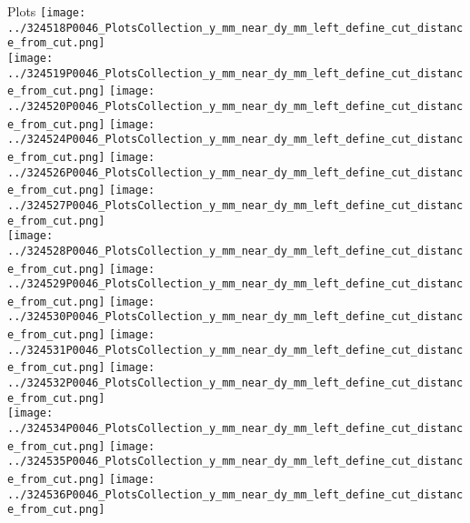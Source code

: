 \documentclass{beamer}
\begin{document}
\begin{frame}
\begin{block}{Plots}
                \texttt{[image: ../324518P0046\_PlotsCollection\_y\_mm\_near\_dy\_mm\_left\_define\_cut\_distance\_from\_cut.png]}\\
                \texttt{[image: ../324519P0046\_PlotsCollection\_y\_mm\_near\_dy\_mm\_left\_define\_cut\_distance\_from\_cut.png]}
                \texttt{[image: ../324520P0046\_PlotsCollection\_y\_mm\_near\_dy\_mm\_left\_define\_cut\_distance\_from\_cut.png]}
                \texttt{[image: ../324524P0046\_PlotsCollection\_y\_mm\_near\_dy\_mm\_left\_define\_cut\_distance\_from\_cut.png]}
                \texttt{[image: ../324526P0046\_PlotsCollection\_y\_mm\_near\_dy\_mm\_left\_define\_cut\_distance\_from\_cut.png]}
                \texttt{[image: ../324527P0046\_PlotsCollection\_y\_mm\_near\_dy\_mm\_left\_define\_cut\_distance\_from\_cut.png]}\\
                \texttt{[image: ../324528P0046\_PlotsCollection\_y\_mm\_near\_dy\_mm\_left\_define\_cut\_distance\_from\_cut.png]}
                \texttt{[image: ../324529P0046\_PlotsCollection\_y\_mm\_near\_dy\_mm\_left\_define\_cut\_distance\_from\_cut.png]}
                \texttt{[image: ../324530P0046\_PlotsCollection\_y\_mm\_near\_dy\_mm\_left\_define\_cut\_distance\_from\_cut.png]}
                \texttt{[image: ../324531P0046\_PlotsCollection\_y\_mm\_near\_dy\_mm\_left\_define\_cut\_distance\_from\_cut.png]}
                \texttt{[image: ../324532P0046\_PlotsCollection\_y\_mm\_near\_dy\_mm\_left\_define\_cut\_distance\_from\_cut.png]}\\
                \texttt{[image: ../324534P0046\_PlotsCollection\_y\_mm\_near\_dy\_mm\_left\_define\_cut\_distance\_from\_cut.png]}
                \texttt{[image: ../324535P0046\_PlotsCollection\_y\_mm\_near\_dy\_mm\_left\_define\_cut\_distance\_from\_cut.png]}
                \texttt{[image: ../324536P0046\_PlotsCollection\_y\_mm\_near\_dy\_mm\_left\_define\_cut\_distance\_from\_cut.png]}

        \end{block}
\end{frame}
\end{document}
